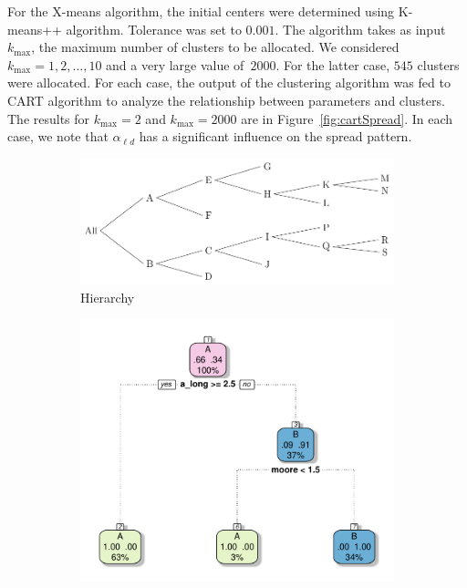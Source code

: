 \documentclass[10pt]{article}
\newcommand{\ald}{\alpha_{\ell d}}
\newcommand{\kmax}{k_{\max}}
\theoremstyle{definition}
\begin{document}
For the X-means algorithm, the initial centers were determined using
K-means++ algorithm. Tolerance was set to $0.001$. The algorithm takes as
input $\kmax$, the maximum number of clusters to be allocated. We
considered~$\kmax=1,2,\ldots,10$ and a very large value of~$2000$. For the
latter case, $545$ clusters were allocated. For each case, the output of
the clustering algorithm was fed to CART algorithm to analyze the
relationship between parameters and clusters. The results for $\kmax=2$
and $\kmax=2000$ are in Figure~\ref{fig:cartSpread}. In each case, we note
that $\ald$ has a significant influence on the spread pattern.
\begin{figure}[ht]
\centering
\begin{subfigure}[b]{.8\textwidth}
\includegraphics[width=\textwidth]{../clustering/results/agglomerative/hierarhcy_agglomerative.pdf}
\caption{Hierarchy}
\end{subfigure}
\begin{subfigure}[b]{.32\textwidth}
\includegraphics[width=\textwidth]{../clustering/results/agglomerative/cart_cAB_agg.pdf}

\end{subfigure}
\end{figure}
\end{document}

